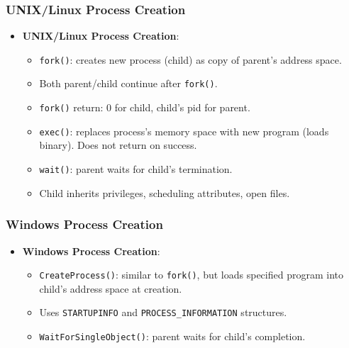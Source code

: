 \subsubsection{UNIX/Linux Process Creation}
\begin{itemize}
    \item \textbf{UNIX/Linux Process Creation}:
        \begin{itemize}
            \item \texttt{fork()}: creates new process (child) as copy of parent's address space.
            \item Both parent/child continue after \texttt{fork()}.
            \item \texttt{fork()} return: 0 for child, child's pid for parent.
            \item \texttt{exec()}: replaces process's memory space with new program (loads binary). Does not return on success.
            \item \texttt{wait()}: parent waits for child's termination.
            \item Child inherits privileges, scheduling attributes, open files.
        \end{itemize}
\end{itemize}

\subsubsection{Windows Process Creation}
\begin{itemize}
    \item \textbf{Windows Process Creation}:
        \begin{itemize}
            \item \texttt{CreateProcess()}: similar to \texttt{fork()}, but loads specified program into child's address space at creation.
            \item Uses \texttt{STARTUPINFO} and \texttt{PROCESS\_INFORMATION} structures.
            \item \texttt{WaitForSingleObject()}: parent waits for child's completion.
        \end{itemize}
\end{itemize}

